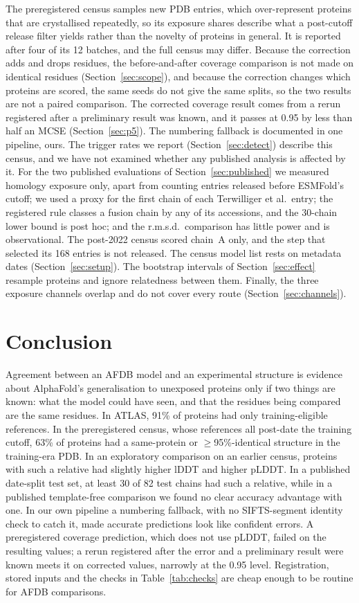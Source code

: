 \documentclass{article}
\begin{document}
The preregistered census samples new PDB entries, which over-represent proteins that are
crystallised repeatedly, so its exposure shares describe what a post-cutoff
release filter yields rather than the novelty of proteins in general. It is
reported after four of its 12 batches, and the full census may differ.
Because the correction adds and drops residues, the before-and-after
coverage comparison is not made on identical residues
(Section~\ref{sec:scope}), and because the correction changes which proteins are scored, the same seeds do not give the same splits, so the two results are not a paired comparison. The corrected coverage result comes from a rerun
registered after a preliminary result was known, and it passes at 0.95 by
less than half an MCSE (Section~\ref{sec:p5}). The numbering fallback is documented in one pipeline, ours. The trigger rates we report (Section~\ref{sec:detect}) describe this census, and
we have not examined whether any published analysis is affected by it. For the two published evaluations of Section~\ref{sec:published} we measured homology exposure only, apart from counting entries released before ESMFold's cutoff; we used a proxy for the first chain of each Terwilliger et al.\ entry; the registered rule classes a fusion chain by any of its accessions, and the 30-chain lower bound is post hoc; and the r.m.s.d.\ comparison has little power and is observational. The post-2022 census scored chain~A only, and the step that selected its 168 entries is not released. The census model list rests on metadata dates (Section~\ref{sec:setup}). The bootstrap intervals of Section~\ref{sec:effect} resample proteins and ignore relatedness between them. Finally, the three exposure channels overlap and do not cover every route (Section~\ref{sec:channels}).

\section{Conclusion}

Agreement between an AFDB model and an experimental structure is evidence about AlphaFold's generalisation to unexposed proteins only if two things are known: what the model could have
seen, and that the residues being compared are the same residues. In ATLAS,
91\% of proteins had only training-eligible references. In the preregistered
census, whose references all post-date the training cutoff, 63\% of proteins had a
same-protein or $\ge$95\%-identical structure in the training-era PDB. In an
exploratory comparison on an earlier census, proteins with such a relative
had slightly higher lDDT and higher pLDDT. In a published date-split test set,
at least 30 of 82 test chains had such a relative, while in a published
template-free comparison we found no clear accuracy advantage with one. In our own pipeline a numbering fallback, with no
SIFTS-segment identity check to catch it, made accurate predictions look
like confident errors. A preregistered coverage prediction, which does not
use pLDDT, failed on the resulting values; a rerun registered after the
error and a preliminary result were known meets it on corrected values,
narrowly at the 0.95 level. Registration, stored
inputs and the checks in Table~\ref{tab:checks} are cheap enough to be
routine for AFDB comparisons.
\end{document}
